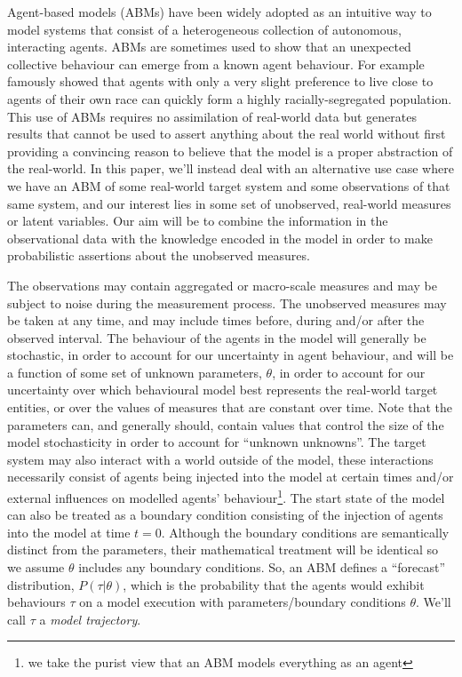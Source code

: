 \documentclass{article}
\begin{document}
Agent-based models (ABMs) have been widely adopted as an intuitive way to model systems that consist of a heterogeneous collection of autonomous, interacting agents. ABMs are sometimes used to show that an unexpected collective behaviour can emerge from a known agent behaviour.  For example \citet{schelling1971dynamic} famously showed that agents with only a very slight preference to live close to agents of their own race can quickly form a highly racially-segregated population. This use of ABMs requires no assimilation of real-world data but generates results that cannot be used to assert anything about the real world without first providing a convincing reason to believe that the model is a proper abstraction of the real-world. In this paper, we'll instead deal with an alternative use case where we have an ABM of some real-world target system and some observations of that same system, and our interest lies in some set of unobserved, real-world measures or latent variables. Our aim will be to combine the information in the observational data with the knowledge encoded in the model in order to make probabilistic assertions about the unobserved measures.

The observations may contain aggregated or macro-scale measures and may be subject to noise during the measurement process. The unobserved measures may be taken at any time, and may include times before, during and/or after the observed interval. The behaviour of the agents in the model will generally be stochastic, in order to account for our uncertainty in agent behaviour, and will be a function of some set of unknown parameters, $\theta$, in order to account for our uncertainty over which behavioural model best represents the real-world target entities, or over the values of measures that are constant over time. Note that the parameters can, and generally should, contain values that control the size of the model stochasticity in order to account for ``unknown unknowns''. The target system may also interact with a world outside of the model, these interactions necessarily consist of agents being injected into the model at certain times and/or external influences on modelled agents' behaviour\footnote{we take the purist view that an ABM models everything as an agent}. The start state of the model can also be treated as a boundary condition consisting of the injection of agents into the model at time $t=0$. Although the boundary conditions are semantically distinct from the parameters, their mathematical treatment will be identical so we assume $\theta$ includes any boundary conditions. So, an ABM defines a ``forecast'' distribution, $P(\tau| \theta)$, which is the probability that the agents would exhibit behaviours $\tau$ on a model execution with parameters/boundary conditions $\theta$. We'll call $\tau$ a \textit{model trajectory}.
\end{document}
